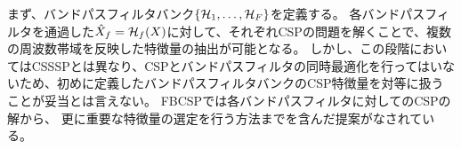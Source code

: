 まず、バンドパスフィルタバンク\(\{ {\cal H}_1, \ldots, {\cal H}_F \}\)を定義する。
各バンドパスフィルタを通過した\(\hat X_f = {\cal H}_f(X)\)に対して、それぞれCSPの問題を解くことで、複数の周波数帯域を反映した特徴量の抽出が可能となる。
しかし、この段階においてはCSSSPとは異なり、CSPとバンドパスフィルタの同時最適化を行ってはいないため、初めに定義したバンドパスフィルタバンクのCSP特徴量を対等に扱うことが妥当とは言えない。
FBCSPでは各バンドパスフィルタに対してのCSPの解から、
更に重要な特徴量の選定を行う方法までを含んだ提案がなされている\cite{fbcsp}。